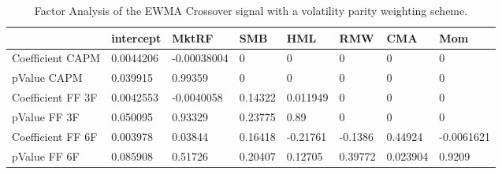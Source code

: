\begin{table}[H]
\centering
\begin{tabular}{llllllll}
\hline& intercept & MktRF & SMB & HML & RMW & CMA & Mom \\ 
\hline 
Coefficient CAPM & 0.0044206 & -0.00038004 & 0 & 0 & 0 & 0 & 0 \\ 
pValue CAPM & 0.039915 & 0.99359 & 0 & 0 & 0 & 0 & 0 \\ 
Coefficient FF 3F & 0.0042553 & -0.0040058 & 0.14322 & 0.011949 & 0 & 0 & 0 \\ 
pValue FF 3F & 0.050095 & 0.93329 & 0.23775 & 0.89 & 0 & 0 & 0 \\ 
Coefficient FF 6F & 0.003978 & 0.03844 & 0.16418 & -0.21761 & -0.1386 & 0.44924 & -0.0061621 \\ 
pValue FF 6F & 0.085908 & 0.51726 & 0.20407 & 0.12705 & 0.39772 & 0.023904 & 0.9209 \\ 
\hline
\end{tabular}
\caption{Factor Analysis of the EWMA Crossover signal with a volatility parity weighting scheme.}
\label{MBBSVPOQ_FACTOR}
\end{table}